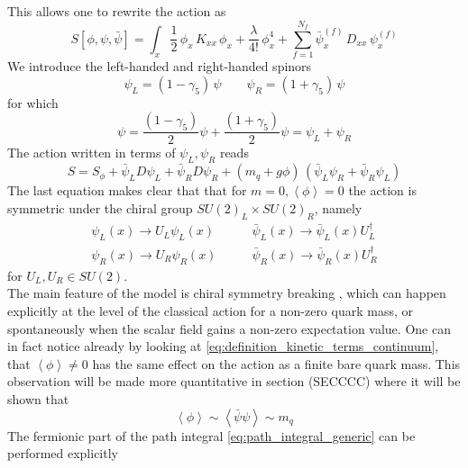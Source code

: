 This allows one to rewrite the action as
\begin{equation*}
    S[\phi,\psi,\bar\psi] = \int_x \frac{1}{2} \, \phi_x \, K_{xx} \, \phi_x + \frac{\lambda}{4!} \, \phi_x^4 + \sum_{f=1}^{N_f} \bar\psi_x^{(f)} \, D_{xx} \, \psi_x^{(f)}
\end{equation*}
We introduce the left-handed and right-handed spinors
\begin{equation*}
	\psi_L = (1-\gamma_5) \, \psi \qquad \psi_R = (1+\gamma_5) \, \psi
\end{equation*}
for which
\begin{equation*}
	\psi = \frac{(1-\gamma_5)}{2} \psi + \frac{(1+\gamma_5)}{2} \psi = \psi_L + \psi_R
\end{equation*}
The action written in terms of $\psi_L, \psi_R$ reads
\begin{equation}
	S = S_\phi +  \bar\psi _L D \psi_L + \bar\psi _R D \psi_R + (m_q + g\phi) \,  \left(\bar\psi_L\psi_R + \bar\psi_R\psi_L\right)
	\label{eq:action_chirality_explicit}
\end{equation}
The last equation makes clear that that for $m=0,\left\langle\phi\right\rangle = 0$ the action is symmetric under the chiral group $SU(2) _L\times SU(2)_R$, namely
\begin{equation*}
	\begin{aligned}
		\psi_L(x) \to U_L\psi_L(x) &\qquad \bar\psi_L(x) \to \bar\psi_L(x) U_L^{\dagger} \\
		 \psi_R(x) \to U_R\psi_R(x) &\qquad \bar\psi_R(x) \to \bar\psi_R(x) U_R^{\dagger}
	\end{aligned}
\end{equation*}
for $U_L, U_R \in SU(2)$.\\
The main feature of the model is chiral symmetry breaking \cite{Nambu1961DynamicalI, Nambu1961DynamicalII}, which can happen explicitly at the level of the classical action for a non-zero quark mass, or spontaneously when the scalar field gains a non-zero expectation value. One can in fact notice already by looking at \eqref{eq:definition_kinetic_terms_continuum}, that $\left\langle\phi\right\rangle \neq 0$ has the same effect on the action as a finite bare quark mass. This observation will be made more quantitative in section (SECCCC) where it will be shown that  
\begin{equation*}
    \left\langle \phi \right\rangle \sim \left\langle \bar \psi \psi \right\rangle \sim m_q
\end{equation*}
The fermionic part of the path integral \eqref{eq:path_integral_generic} can be performed explicitly
